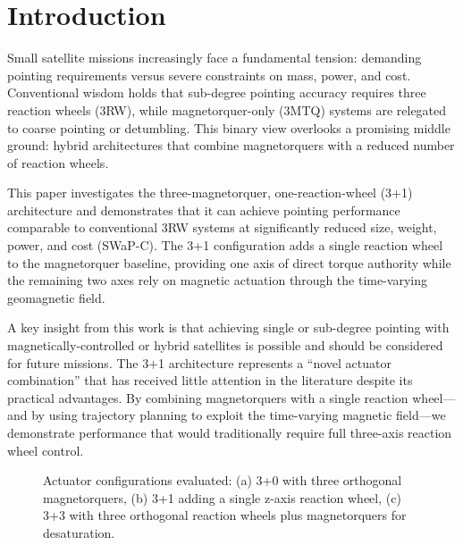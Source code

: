 \documentclass[9pt]{extarticle}
\begin{document}
\section{Introduction}\label{sec:intro}

Small satellite missions increasingly face a fundamental tension: demanding pointing requirements versus severe constraints on mass, power, and cost. Conventional wisdom holds that sub-degree pointing accuracy requires three reaction wheels (3RW), while magnetorquer-only (3MTQ) systems are relegated to coarse pointing or detumbling. This binary view overlooks a promising middle ground: hybrid architectures that combine magnetorquers with a reduced number of reaction wheels.

This paper investigates the three-magnetorquer, one-reaction-wheel (3+1) architecture and demonstrates that it can achieve pointing performance comparable to conventional 3RW systems at significantly reduced size, weight, power, and cost (SWaP-C). The 3+1 configuration adds a single reaction wheel to the magnetorquer baseline, providing one axis of direct torque authority while the remaining two axes rely on magnetic actuation through the time-varying geomagnetic field.

A key insight from this work is that achieving single or sub-degree pointing with magnetically-controlled or hybrid satellites is possible and should be considered for future missions. The 3+1 architecture represents a ``novel actuator combination'' that has received little attention in the literature despite its practical advantages. By combining magnetorquers with a single reaction wheel---and by using trajectory planning to exploit the time-varying magnetic field---we demonstrate performance that would traditionally require full three-axis reaction wheel control.

\begin{figure}[h]
    \centering
    \caption{Actuator configurations evaluated: (a) 3+0 with three orthogonal magnetorquers, (b) 3+1 adding a single z-axis reaction wheel, (c) 3+3 with three orthogonal reaction wheels plus magnetorquers for desaturation.}
    \label{fig:actuator_configs}
\end{figure}
\end{document}
